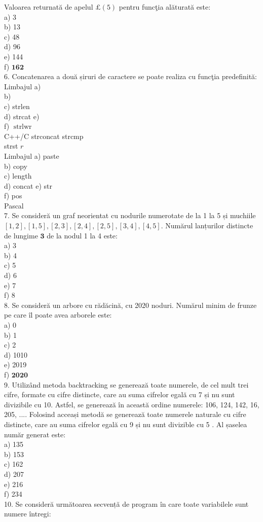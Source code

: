\documentclass[10pt]{article}
\begin{document}
Valoarea returnată de apelul $\pounds(5)$ pentru funcţia alăturată este:\\
a) 3\\
b) 13\\
c) 48\\
d) 96\\
e) 144\\
f) $\mathbf{1 6 2}$\\
6. Concatenarea a două șiruri de caractere se poate realiza cu funcţia predefinită:\\
Limbajul a)\\
b)\\
c) strlen\\
d) strcat e)\\
f) $\operatorname{strlwr}$\\
C++/C strconcat strcmp\\
strst $r$\\
Limbajul a) paste\\
b) copy\\
c) length\\
d) concat e) str\\
f) pos\\
Pascal\\
7. Se consideră un graf neorientat cu nodurile numerotate de la 1 la 5 și muchiile $[1,2],[1,5],[2,3],[2,4],[2,5],[3,4],[4,5]$. Numărul lanțurilor distincte de lungime $\mathbf{3}$ de la nodul 1 la 4 este:\\
a) 3\\
b) 4\\
c) 5\\
d) 6\\
e) 7\\
f) 8\\
8. Se consideră un arbore cu rădăcină, cu 2020 noduri. Numărul minim de frunze pe care îl poate avea arborele este:\\
a) 0\\
b) 1\\
c) 2\\
d) 1010\\
e) 2019\\
f) $\mathbf{2 0 2 0}$\\
9. Utilizând metoda backtracking se generează toate numerele, de cel mult trei cifre, formate cu cifre distincte, care au suma cifrelor egală cu 7 și nu sunt divizibile cu 10. Astfel, se generează în această ordine numerele: 106, 124, 142, 16, 205, .... Folosind acceași metodă se generează toate numerele naturale cu cifre distincte, care au suma cifrelor egală cu 9 și nu sunt divizible cu 5 . Al șaselea număr generat este:\\
a) 135\\
b) 153\\
c) 162\\
d) 207\\
e) 216\\
f) 234\\
10. Se consideră următoarea secvență de program în care toate variabilele sunt numere întregi:
\end{document}
